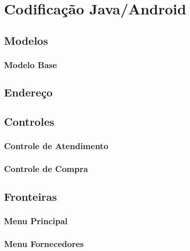 \section{Codificação Java/Android}


\subsection{Modelos}

\subsubsection{Modelo Base}

\subsection{Endereço}



\subsection{Controles}

\subsubsection{Controle de Atendimento}

\subsubsection{Controle de Compra}



\subsection{Fronteiras}

\subsubsection{Menu Principal}

\subsubsection{Menu Fornecedores}
